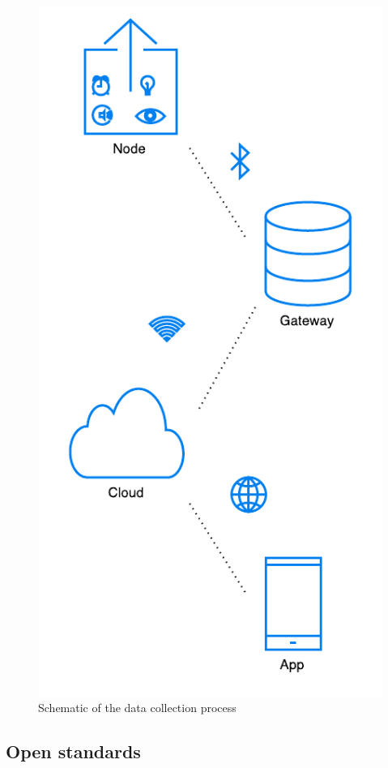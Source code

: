 \documentclass{below-ext}
\begin{document}
\begin{figure}
\centering
\includegraphics[scale=0.6]{dataproces.pdf}
\caption{Schematic of the data collection process}
\label{fig:process}
\end{figure}

\subsection{Open standards}
\end{document}
